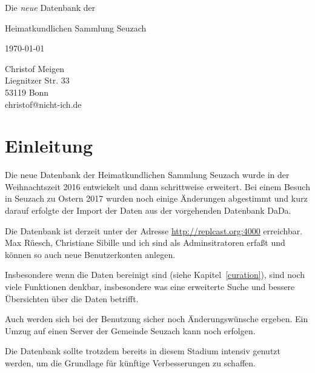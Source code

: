 \documentclass[12pt]{scrreprt}
\begin{document}
\def\DB{Datenbank der Heimatkundlichen Sammlung Seuzach}
\def\RB#1{{\color{red} \textsf{\textbf{#1}}}}
\strut
\thispagestyle{empty}
\vfill


\begin{center}
  
{\Huge Die \textit{neue} Datenbank der

  \medskip
  
Heimatkundlichen Sammlung Seuzach}

\bigskip


\bigskip

\today
\end{center}


\vfill

\hfill \begin{minipage}{5cm}
  Christof Meigen\\
  Liegnitzer Str. 33 \\
53119 Bonn \\
christof@nicht-ich.de
\end{minipage}

\clearpage

\tableofcontents

\clearpage

\chapter{Einleitung}

Die neue Datenbank der Heimatkundlichen Sammlung Seuzach wurde in der Weihnachtszeit 2016
entwickelt und dann schrittweise erweitert. Bei einem Besuch in Seuzach zu Ostern 2017
wurden noch einige Änderungen abgestimmt und kurz darauf erfolgte der Import der Daten aus
der vorgehenden Datenbank DaDa.

Die Datenbank ist derzeit unter der Adresse
\url{http://replcast.org:4000} erreichbar.  Max Rüesch, Christiane
Sibille und ich sind als Adminsitratoren erfaßt und können so auch
neue Benutzerkonten anlegen.

Insbesondere wenn die Daten bereinigt sind (siehe
Kapitel~\ref{curation}), sind noch viele Funktionen denkbar, insbesondere
was eine erweiterte Suche und bessere Übersichten über die Daten betrifft.

Auch werden sich bei der Benutzung sicher noch Änderungswünsche
ergeben. Ein Umzug auf einen Server der Gemeinde Seuzach kann
noch erfolgen.

Die Datenbank sollte trotzdem bereits in diesem Stadium intensiv
genutzt werden, um die Grundlage für künftige Verbesserungen zu
schaffen.
\end{document}

